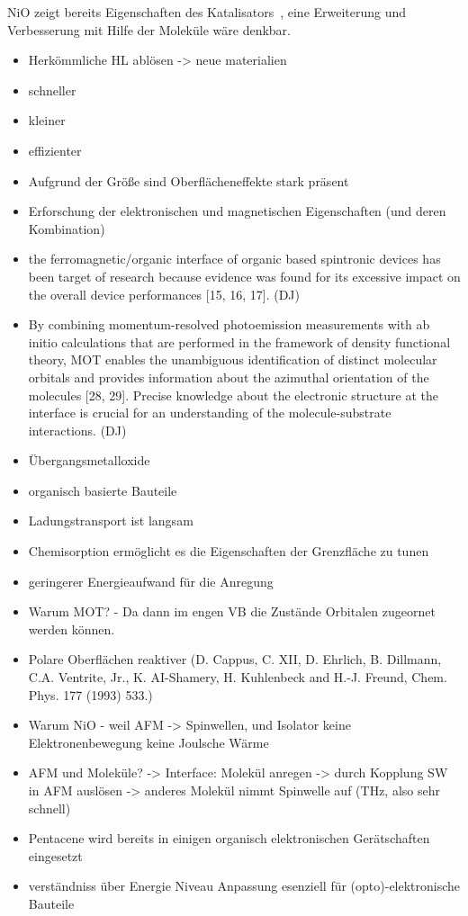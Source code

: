    NiO zeigt bereits Eigenschaften des Katalisators~\cite{kunz_chemisorption_1985}, eine Erweiterung und Verbesserung mit Hilfe der Moleküle wäre denkbar.
\begin{itemize}
    \item Herkömmliche HL ablösen -> neue materialien
    \item schneller
    \item kleiner
    \item effizienter
    \item Aufgrund der Größe sind Oberflächeneffekte stark präsent
    \item Erforschung der elektronischen und magnetischen Eigenschaften (und deren Kombination)
    \item the ferromagnetic/organic interface of organic     based spintronic devices has been target of research because evidence was found for its excessive impact on the overall device performances [15, 16, 17]. (DJ)
    \item By combining momentum-resolved photoemission measurements with ab initio calculations that are performed in the framework of density functional theory, MOT enables the unambiguous identification of distinct molecular orbitals and provides information about the azimuthal orientation of the molecules [28, 29]. Precise knowledge about the electronic structure at the interface is crucial for an understanding of the molecule-substrate interactions. (DJ)
    \item Übergangsmetalloxide
    \item organisch basierte Bauteile
    \item Ladungstransport ist langsam
    \item Chemisorption ermöglicht es die Eigenschaften der Grenzfläche zu tunen
    \item geringerer Energieaufwand für die Anregung
    \item Warum MOT? - Da dann im engen VB die Zustände Orbitalen zugeornet werden können.
    \item Polare Oberflächen reaktiver (D. Cappus, C. XII, D. Ehrlich, B. Dillmann, C.A. Ventrite, Jr., K. AI-Shamery, H. Kuhlenbeck and H.-J. Freund, Chem. Phys. 177 (1993) 533.)
    \item Warum NiO - weil AFM -> Spinwellen, und Isolator keine Elektronenbewegung keine Joulsche Wärme
    \item AFM und Moleküle? -> Interface: Molekül anregen -> durch Kopplung SW in AFM auslösen -> anderes Molekül nimmt Spinwelle auf (THz, also sehr schnell)
    \item Pentacene wird bereits in einigen organisch elektronischen Gerätschaften eingesetzt \cite{5A_4}
    \item verständniss über Energie Niveau Anpassung esenziell für (opto)-elektronische Bauteile
\end{itemize}